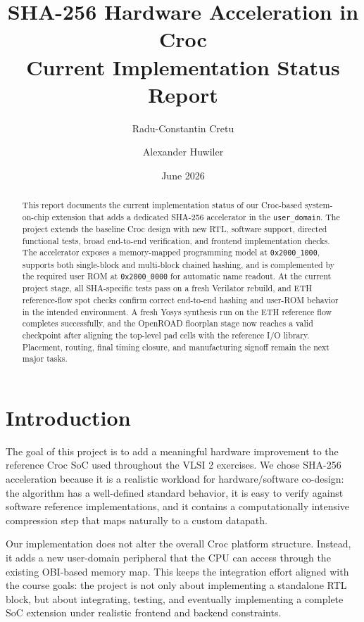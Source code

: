 \documentclass[11pt,a4paper]{article}
\title{\textbf{SHA-256 Hardware Acceleration in Croc}\\
\large Current Implementation Status Report}
\author{Radu-Constantin Cretu \and Alexander Huwiler}
\date{June 2026}
\begin{document}
\maketitle

\begin{abstract}
This report documents the current implementation status of our Croc-based
system-on-chip extension that adds a dedicated SHA-256 accelerator in the
\texttt{user\_domain}. The project extends the baseline Croc design with new RTL,
software support, directed functional tests, broad end-to-end verification, and
frontend implementation checks. The accelerator exposes a memory-mapped
programming model at \texttt{0x2000\_1000}, supports both single-block and
multi-block chained hashing, and is complemented by the required user ROM at
\texttt{0x2000\_0000} for automatic name readout. At the current project stage,
all SHA-specific tests pass on a fresh Verilator rebuild, and ETH
reference-flow spot checks confirm correct end-to-end hashing and user-ROM
behavior in the intended environment. A fresh Yosys synthesis run on the ETH
reference flow completes successfully, and the OpenROAD floorplan stage now
reaches a valid checkpoint after aligning the top-level pad cells with the
reference I/O library. Placement, routing, final timing closure, and
manufacturing signoff remain the next major tasks.
\end{abstract}

\section{Introduction}
The goal of this project is to add a meaningful hardware improvement to the
reference Croc SoC used throughout the VLSI 2 exercises. We chose SHA-256
acceleration because it is a realistic workload for hardware/software
co-design: the algorithm has a well-defined standard behavior, it is easy to
verify against software reference implementations, and it contains a
computationally intensive compression step that maps naturally to a custom
datapath.

Our implementation does not alter the overall Croc platform structure. Instead,
it adds a new user-domain peripheral that the CPU can access through the
existing OBI-based memory map. This keeps the integration effort aligned with
the course goals: the project is not only about implementing a standalone RTL
block, but about integrating, testing, and eventually implementing a complete
SoC extension under realistic frontend and backend constraints.
\end{document}
